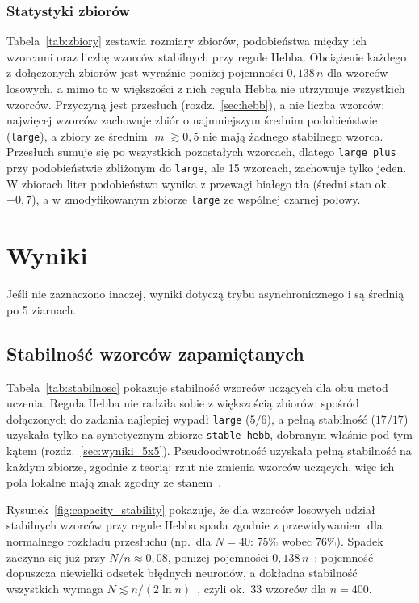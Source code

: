 \documentclass{article}
\begin{document}
\subsubsection{Statystyki zbiorów}
\label{sec:ds_stats}
Tabela~\ref{tab:zbiory} zestawia rozmiary zbiorów, podobieństwa między ich wzorcami
oraz liczbę wzorców stabilnych przy regule Hebba.
Obciążenie każdego z dołączonych zbiorów jest wyraźnie poniżej pojemności $0{,}138\,n$ dla wzorców losowych,
a mimo to w większości z nich reguła Hebba nie utrzymuje wszystkich wzorców.
Przyczyną jest przesłuch (rozdz.~\ref{sec:hebb}), a nie liczba wzorców:
najwięcej wzorców zachowuje zbiór o najmniejszym średnim podobieństwie (\texttt{large}),
a zbiory ze średnim $|m| \gtrsim 0{,}5$ nie mają żadnego stabilnego wzorca.
Przesłuch sumuje się po wszystkich pozostałych wzorcach,
dlatego \texttt{large plus} przy podobieństwie zbliżonym do \texttt{large}, ale 15 wzorcach, zachowuje tylko jeden.
W zbiorach liter podobieństwo wynika z przewagi białego tła (średni stan ok.\ $-0{,}7$),
a w zmodyfikowanym zbiorze \texttt{large} ze wspólnej czarnej połowy.



\section{Wyniki}
\label{sec:wyniki}
Jeśli nie zaznaczono inaczej, wyniki dotyczą trybu asynchronicznego i są średnią po 5 ziarnach.

\subsection{Stabilność wzorców zapamiętanych}
\label{sec:wyniki_stabilnosc}

Tabela~\ref{tab:stabilnosc} pokazuje stabilność wzorców uczących dla obu metod uczenia.
Reguła Hebba nie radziła sobie z większością zbiorów: spośród dołączonych do zadania najlepiej wypadł \texttt{large} ($5/6$),
a pełną stabilność ($17/17$) uzyskała tylko na syntetycznym zbiorze \texttt{stable-hebb}, dobranym właśnie pod tym kątem
(rozdz.~\ref{sec:wyniki_5x5}).
Pseudoodwrotność uzyskała pełną stabilność na każdym zbiorze, zgodnie z teorią:
rzut nie zmienia wzorców uczących, więc ich pola lokalne mają znak zgodny ze stanem~\cite{personnaz1985}.

Rysunek~\ref{fig:capacity_stability} pokazuje, że dla wzorców losowych udział stabilnych wzorców przy regule Hebba
spada zgodnie z przewidywaniem dla normalnego rozkładu przesłuchu (np.\ dla $N = 40$: $75\%$ wobec $76\%$).
Spadek zaczyna się już przy $N/n \approx 0{,}08$, poniżej pojemności $0{,}138\,n$~\cite{amit1985}:
pojemność dopuszcza niewielki odsetek błędnych neuronów,
a dokładna stabilność wszystkich wymaga $N \lesssim n/(2\ln n)$~\cite{mceliece1987}, czyli ok.\ $33$ wzorców dla $n = 400$.
\end{document}
